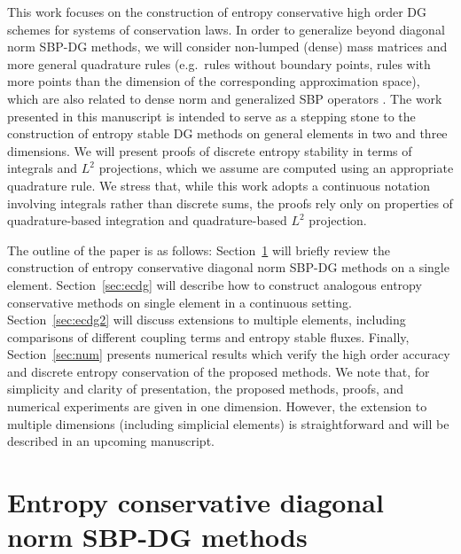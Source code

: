 \documentclass[preprint,10pt]{elsarticle}
\theoremstyle{definition}
\theoremstyle{lemma}
\theoremstyle{theorem}
\theoremstyle{assumption}
\newcommand{\note}[1]{{\color{blue}{#1}}}
\begin{document}
This work focuses on the construction of entropy conservative high order DG schemes for systems of conservation laws.  In order to generalize beyond diagonal norm SBP-DG methods, we will consider non-lumped (dense) mass matrices and more general quadrature rules (e.g.\ rules without boundary points, rules with more points than the dimension of the corresponding approximation space), which are also related to dense norm and generalized SBP operators \cite{ranocha2016summation, ranocha2017extended, ranocha2017comparison}.  The work presented in this manuscript is intended to serve as a stepping stone to the construction of entropy stable DG methods on general elements in two and three dimensions.  We will present proofs of discrete entropy stability in terms of integrals and $L^2$ projections, which we assume are computed using an appropriate quadrature rule.  We stress that, while this work adopts a continuous notation involving integrals rather than discrete sums, the proofs rely only on properties of quadrature-based integration and quadrature-based $L^2$ projection.  

The outline of the paper is as follows: Section~\ref{sec:intro} will briefly review the construction of entropy conservative diagonal norm SBP-DG methods on a single element.  Section~\ref{sec:ecdg} will describe how to construct analogous entropy conservative methods on single element in a continuous setting.  Section~\ref{sec:ecdg2} will discuss extensions to multiple elements, including comparisons of different coupling terms and entropy stable fluxes.  Finally, Section~\ref{sec:num} presents numerical results which verify the high order accuracy and discrete entropy conservation of the proposed methods.  We note that, for simplicity and clarity of presentation, the proposed methods, proofs, and numerical experiments are given in one dimension.  However, the extension to multiple dimensions (including simplicial elements) is straightforward and will be described in an upcoming manuscript.  




\section{Entropy conservative diagonal norm SBP-DG methods}
\label{sec:intro}
\end{document}
